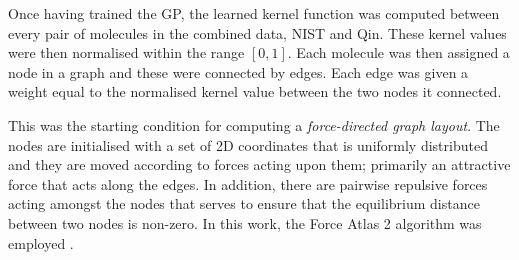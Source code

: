 Once having trained the GP, the learned kernel function was computed between
every pair of molecules in the combined data, NIST and Qin. These kernel values
were then normalised within the range $[0, 1]$. Each molecule was then assigned
a node in a graph and these were connected by edges. Each edge was given a
weight equal to the normalised kernel value between the two nodes it connected.

This was the starting condition for computing a \emph{force-directed graph
    layout}. The nodes are initialised with a set of 2D coordinates that is
uniformly distributed and they are moved according to forces acting upon them;
primarily an attractive force that acts along the edges. In addition, there are
pairwise repulsive forces acting amongst the nodes that serves to ensure that
the equilibrium distance between two nodes is non-zero. In this work, the Force
Atlas 2 algorithm was employed
\cite{jacomyForceAtlas2ContinuousGraph2014,bastianGephiOpenSource2009}.